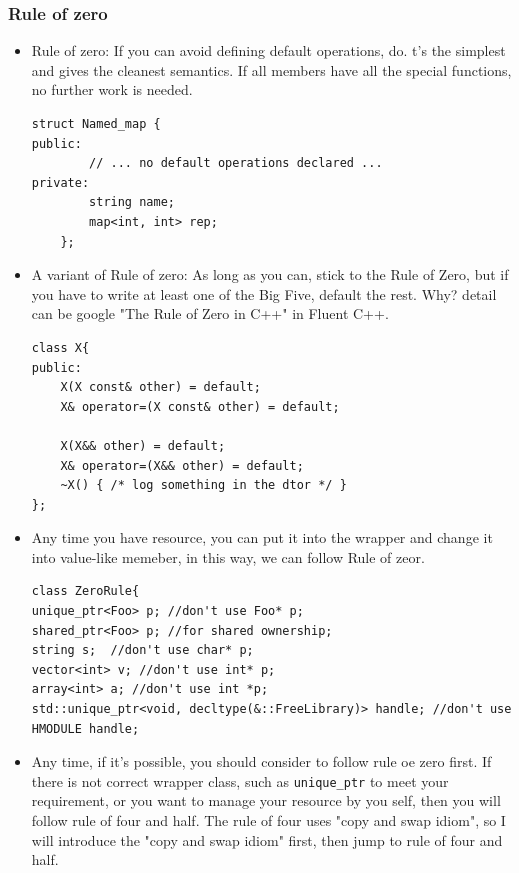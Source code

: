 \documentclass[a4paper,11pt,twoside]{book}
\begin{document}
\subsubsection{Rule of zero}
\begin{itemize}
    \item Rule of zero: If you can avoid defining default operations, do. t’s the simplest and gives the cleanest semantics. If all members have all the special functions, no further work is needed.
	
\begin{lstlisting}
struct Named_map {
public:
		// ... no default operations declared ...
private:
		string name;
		map<int, int> rep;
	};
\end{lstlisting}

	\item A variant of Rule of zero: As long as you can, stick to the Rule of Zero, but if you have to write at least one of the Big Five, default the rest. Why? detail can be google "The Rule of Zero in C++" in Fluent C++.
	 
\begin{lstlisting}
class X{
public:
	X(X const& other) = default;
	X& operator=(X const& other) = default;
	
	X(X&& other) = default;
	X& operator=(X&& other) = default;
	~X() { /* log something in the dtor */ }
};
\end{lstlisting}

    \item Any time you have resource, you can put it into the wrapper and change it into value-like memeber, in this way, we can follow Rule of zeor.

\begin{lstlisting}
class ZeroRule{
unique_ptr<Foo> p; //don't use Foo* p;
shared_ptr<Foo> p; //for shared ownership;
string s;  //don't use char* p;
vector<int> v; //don't use int* p;
array<int> a; //don't use int *p;
std::unique_ptr<void, decltype(&::FreeLibrary)> handle; //don't use HMODULE handle;
\end{lstlisting}

    \item Any time, if it's possible, you should consider to follow rule oe zero first. If there is not correct wrapper class, such as \texttt{unique\_ptr} to meet your requirement, or you want to manage your resource by you self, then you will follow rule of four and half. The rule of four uses "copy and swap idiom", so I will introduce the "copy and swap idiom" first, then jump to rule of four and half.

\end{itemize}
\end{document}
